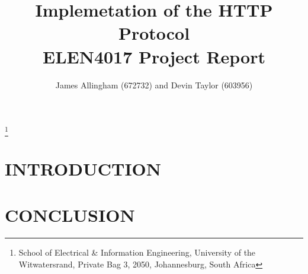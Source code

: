 \documentclass[10pt,twocolumn]{witseiepaper}
\begin{document}
\title{Implemetation of the HTTP Protocol \\ ELEN4017 Project Report}

\author{James Allingham (672732) and Devin Taylor (603956)}
\thanks{School of Electrical \& Information Engineering, University of the
Witwatersrand, Private Bag 3, 2050, Johannesburg, South Africa}



\abstract{}

\keywords{}


\maketitle

\section{INTRODUCTION}


\section{CONCLUSION}





\begin{thebibliography}{1}

\end{thebibliography}




\clearpage
\onecolumn
\appendix
\end{document}
